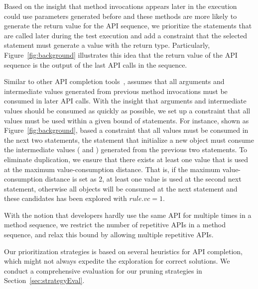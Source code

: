  Based on the insight that method invocations appears  later in the execution could use parameters generated before and these methods are more likely to generate the return value for the API sequence, we prioritize the statements that are called later during the test execution and add a constraint that the selected statement must generate a value with the return type. Particularly, Figure~\ref{fig:background} illustrates this idea that  the return value  of the API sequence  is the output of the last API calls in the sequence. 
 
   Similar to other API completion tools~\cite{isil:sypet17, jungloid:pldi05}, \tool assumes that all arguments and intermediate values generated from previous method invocations must be consumed in later API calls. With the insight that arguments and intermediate values should be consumed as quickly as possible, we set up a constraint that all values must be used within a given bound of statements. For instance, shown as Figure~\ref{fig:background}, based a constraint that all values must be consumed in the next two statements, the statement that initialize a new  object  must consume the intermediate values  ( and ) generated from the previous two statements. To eliminate duplication, we ensure that there exists at least one value that is used at the maximum value-consumption distance. That is, if the maximum value-consumption distance is set as 2, at least one  value is used at the second next statement, otherwise all objects will be consumed at the next statement and these candidates has been explored with $rule.vc = 1$.  
 
  With the notion that developers hardly use the same API for multiple times in a method sequence, we restrict the number of repetitive APIs in a method sequence, and relax this bound by allowing multiple repetitive APIs. 

Our prioritization strategies is based on several heuristics for API completion, which might not always expedite the exploration for correct solutions. We conduct a comprehensive  evaluation for our pruning strategies in Section~\ref{sec:strategyEval}. 
 


